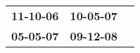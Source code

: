 \begin{supertabular}{p{0.33\columnwidth}p{0.33\columnwidth}p{0.33\columnwidth}}
 \textbf{11-10-06\textsuperscript{}} &  \textbf{10-05-07\textsuperscript{}} \\
 \textbf{05-05-07\textsuperscript{}} &  \textbf{09-12-08\textsuperscript{}} \\
\end{supertabular}
